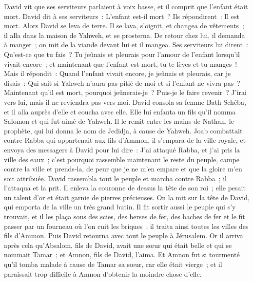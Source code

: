 \begin{multicols}{2}
David vit que ses serviteurs parlaient à voix basse, et il comprit que l'enfant était mort. David dit à ses serviteurs~: L'enfant est-il mort~? Ils répondirent~: Il est mort.
Alors David se leva de terre. Il se lava, s'oignit, et changea de vêtements~; il alla dans la maison de Yahweh, et se prosterna. De retour chez lui, il demanda à manger~; on mit de la viande devant lui et il mangea.
Ses serviteurs lui dirent~: Qu'est-ce que tu fais~? Tu jeûnais et pleurais pour l'amour de l'enfant lorsqu'il vivait encore~; et maintenant que l'enfant est mort, tu te lèves et tu manges~!
Mais il répondit~: Quand l'enfant vivait encore, je jeûnais et pleurais, car je disais~: Qui sait si Yahweh n'aura pas pitié de moi et si l'enfant ne vivra pas~?
Maintenant qu'il est mort, pourquoi jeûnerais-je~? Puis-je le faire revenir~? J'irai vers lui, mais il ne reviendra pas vers moi.
David consola sa femme Bath-Schéba, et il alla auprès d'elle et coucha avec elle. Elle lui enfanta un fils qu'il nomma Salomon et qui fut aimé de Yahweh.
Il le remit entre les mains de Nathan, le prophète, qui lui donna le nom de Jedidja, à cause de Yahweh.
Joab combattait contre Rabba qui appartenait aux fils d'Ammon, il s'empara de la ville royale,
et envoya des messagers à David pour lui dire~: J'ai attaqué Rabba, et j'ai pris la ville des eaux~;
c'est pourquoi rassemble maintenant le reste du peuple, campe contre la ville et prends-la, de peur que je ne m'en empare et que la gloire m'en soit attribuée.
David rassembla tout le peuple et marcha contre Rabba~; il l'attaqua et la prit.
Il enleva la couronne de dessus la tête de son roi~; elle pesait un talent d'or et était garnie de pierres précieuses. On la mit sur la tête de David, qui emporta de la ville un très grand butin.
Il fit sortir aussi le peuple qui s'y trouvait, et il les plaça sous des scies, des herses de fer, des haches de fer et le fit passer par un fourneau où l'on cuit les briques~; il traita ainsi toutes les villes des fils d'Ammon. Puis David retourna avec tout le peuple à Jérusalem.
\VerseOne{}Or il arriva après cela qu'Absalom, fils de David, avait une sœur qui était belle et qui se nommait Tamar~; et Amnon, fils de David, l'aima.
Et Amnon fut si tourmenté qu'il tomba malade à cause de Tamar sa sœur, car elle était vierge~; et il paraissait trop difficile à Amnon d'obtenir la moindre chose d'elle.

\end{multicols}
